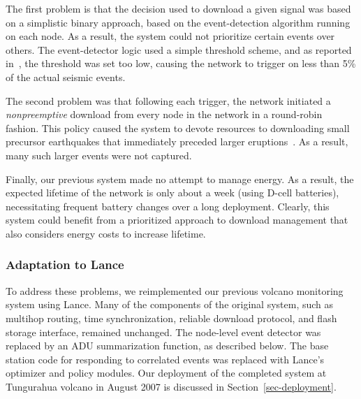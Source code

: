 The first problem is that the decision used to download a given signal 
was based on a simplistic binary approach, based on the event-detection 
algorithm running on each node. As a result, the system could not 
prioritize certain events over others. The event-detector logic used 
a simple threshold scheme, and as reported in~\cite{volcano-osdi06}, 
the threshold was set too low, causing the network to trigger on less 
than 5\% of the actual seismic events.


The second problem was that following each trigger, the network 
initiated a {\em nonpreemptive} download from every node in the
network in a round-robin fashion. This policy caused 
the system to devote resources to downloading small precursor earthquakes 
that immediately preceded larger eruptions~\cite{volcano-osdi06}. 
As a result, many such larger events were not captured. 

Finally, our previous system made no attempt to manage energy. 
As a result, the expected lifetime of the
network is only about a week (using D-cell batteries), necessitating
frequent battery changes over a long deployment.
Clearly, this system could benefit from a prioritized approach to
download management that also considers energy costs to increase
lifetime.

\subsubsection{Adaptation to Lance}

To address these problems, we reimplemented our previous volcano
monitoring system using Lance. Many of the components of the original system,
such as multihop routing, time synchronization, reliable download
protocol, and flash storage interface, remained unchanged. 
The node-level event detector was replaced by an ADU summarization function,
as described below. The base station code for responding to
correlated events was replaced with Lance's optimizer and
policy modules. Our deployment of the completed system at Tungurahua
volcano in August 2007 is discussed in Section~\ref{sec-deployment}.

